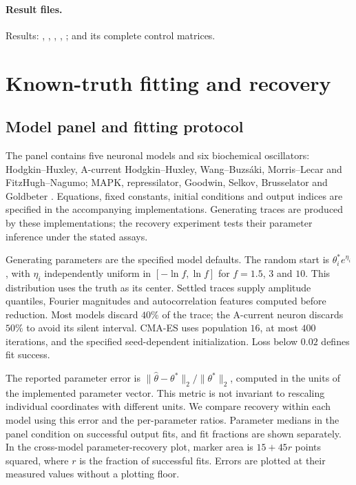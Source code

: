 \documentclass[11pt,letterpaper]{article}
\begin{document}
\paragraph{Result files.}
Results: , , , , ;  and its complete control matrices.

\section{Known-truth fitting and recovery}
\subsection{Model panel and fitting protocol}
The panel contains five neuronal models and six biochemical oscillators: Hodgkin--Huxley, A-current Hodgkin--Huxley, Wang--Buzs\'aki, Morris--Lecar and FitzHugh--Nagumo; MAPK, repressilator, Goodwin, Selkov, Brusselator and Goldbeter \citep{hodgkin1952quantitative,connor1971prediction,wang1996gamma,morris1981voltage,fitzhugh1961impulses,kholodenko2000negative,elowitz2000synthetic,goodwin1965oscillatory,selkov1968self,prigogine1968symmetry,goldbeter1991minimal}. Equations, fixed constants, initial conditions and output indices are specified in the accompanying implementations. Generating traces are produced by these implementations; the recovery experiment tests their parameter inference under the stated assays.

Generating parameters are the specified model defaults. The random start is $\theta_i^*e^{\eta_i}$, with $\eta_i$ independently uniform in $[-\ln f,\ln f]$ for $f=1.5$, $3$ and $10$. This distribution uses the truth as its center. Settled traces supply amplitude quantiles, Fourier magnitudes and autocorrelation features computed before reduction. Most models discard $40\%$ of the trace; the A-current neuron discards $50\%$ to avoid its silent interval. CMA-ES uses population $16$, at most $400$ iterations, and the specified seed-dependent initialization. Loss below $0.02$ defines fit success.

The reported parameter error is $\|\hat\theta-\theta^*\|_2/\|\theta^*\|_2$, computed in the units of the implemented parameter vector. This metric is not invariant to rescaling individual coordinates with different units. We compare recovery within each model using this error and the per-parameter ratios. Parameter medians in the panel condition on successful output fits, and fit fractions are shown separately. In the cross-model parameter-recovery plot, marker area is $15+45r$ points squared, where $r$ is the fraction of successful fits. Errors are plotted at their measured values without a plotting floor.
\end{document}

